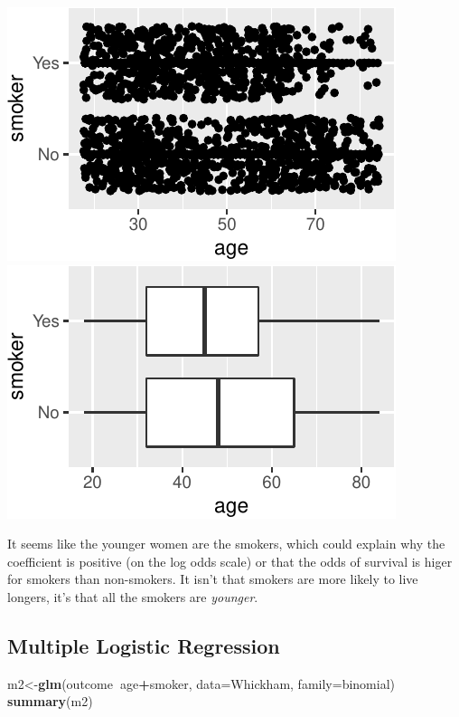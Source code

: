 \documentclass[]{article}
\newenvironment{Shaded}{\begin{snugshade}}{\end{snugshade}}
\newcommand{\DataTypeTok}[1]{\textcolor[rgb]{0.13,0.29,0.53}{#1}}
\newcommand{\KeywordTok}[1]{\textcolor[rgb]{0.13,0.29,0.53}{\textbf{#1}}}
\newcommand{\NormalTok}[1]{#1}
\newcommand{\OperatorTok}[1]{\textcolor[rgb]{0.81,0.36,0.00}{\textbf{#1}}}
\begin{document}
\includegraphics{20-inclasslab-answers_files/figure-latex/unnamed-chunk-12-1.pdf}
\includegraphics{20-inclasslab-answers_files/figure-latex/unnamed-chunk-12-2.pdf}

It seems like the younger women are the smokers, which could explain why
the coefficient is positive (on the log odds scale) or that the odds of
survival is higer for smokers than non-smokers. It isn't that smokers
are more likely to live longers, it's that all the smokers are
\emph{younger}.

\vspace{0.5in}

\hypertarget{multiple-logistic-regression}{%
\subsection{Multiple Logistic
Regression}\label{multiple-logistic-regression}}

\begin{Shaded}
\begin{Highlighting}[]
\NormalTok{m2<-}\KeywordTok{glm}\NormalTok{(outcome}\OperatorTok{~}\NormalTok{age}\OperatorTok{+}\NormalTok{smoker, }\DataTypeTok{data=}\NormalTok{Whickham, }\DataTypeTok{family=}\NormalTok{binomial)}
\KeywordTok{summary}\NormalTok{(m2)}
\end{Highlighting}
\end{Shaded}
\end{document}
